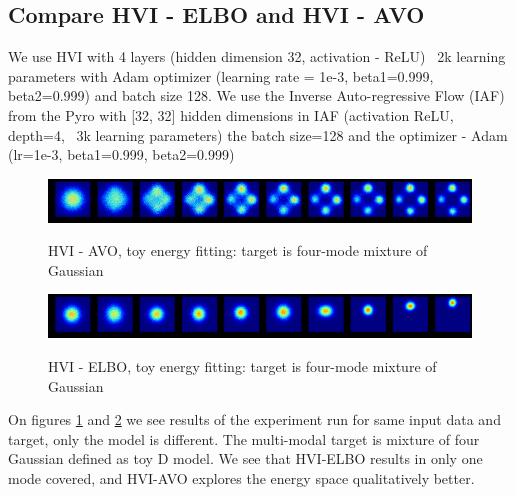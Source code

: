 \documentclass{article}
\begin{document}

\subsection{Compare HVI - ELBO and HVI - AVO}

We use HVI with 4 layers (hidden dimension 32, activation - ReLU) ~2k learning parameters with Adam optimizer (learning rate = 1e-3,  beta1=0.999, beta2=0.999) and batch size 128. We use the Inverse Auto-regressive Flow (IAF) from the Pyro with [32, 32] hidden dimensions in IAF (activation ReLU, depth=4, ~3k learning parameters)  the batch size=128 and the optimizer - Adam (lr=1e-3, beta1=0.999, beta2=0.999)        
\begin{figure}
    \caption{HVI - AVO, toy energy fitting: target is four-mode mixture of Gaussian}
    \centering
    \includegraphics[width=\textwidth]{HVI - AVO}
    \label{HVIAVO}
\end{figure}

\begin{figure}
    \caption{HVI - ELBO, toy energy fitting: target is four-mode mixture of Gaussian}
    \centering
    \includegraphics[width=\textwidth]{HVI - ELBO}
    \label{HVIELBO}
\end{figure}

On figures \ref{HVIAVO} and \ref{HVIELBO} we see results of the experiment run for same input data and target, only the model is different.
The multi-modal target is mixture of four Gaussian defined as toy D model. We see that HVI-ELBO results in only one mode covered, and HVI-AVO explores the energy space qualitatively better. 
\end{document}
